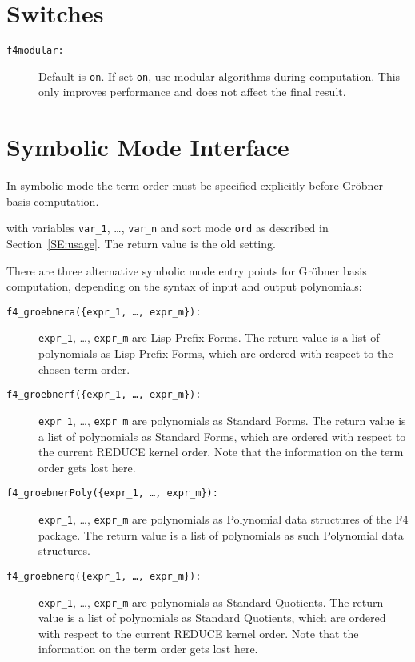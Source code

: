 \documentclass{article}
\newcommand{\grobner}{Gr\"obner}
\newcommand{\code}[1]{\texttt{#1}}
\begin{document}
\section{Switches}
\label{SE:switches}

\begin{description}
\item[\code{f4modular:}] Default is \code{on}. If set \code{on}, use modular algorithms
during computation. This only improves performance and does not affect the final result. 
\end{description}

\section{Symbolic Mode Interface}

In symbolic mode the term order must be specified explicitly before \grobner{} basis computation.
%
\begin{description}\sloppy
\item[\code{torder(\{\{'list, var\_1, \ldots, var\_n\}, ord\}):}] with variables \code{var\_1},
\dots, \code{var\_n} and sort mode \code{ord} as described in Section~\ref{SE:usage}. The return
value is the old setting.
\end{description}

There are three alternative symbolic mode entry points for \grobner{} basis computation, depending
on the syntax of input and output polynomials:
\begin{description}
\item[\code{f4\_groebnera(\{expr\_1, \ldots, expr\_m\}):}] \code{expr\_1}, \dots, \code{expr\_m} are
Lisp Prefix Forms. The return value is a list of polynomials as Lisp Prefix Forms, which are ordered
with respect to the chosen term order.
%
\item[\code{f4\_groebnerf(\{expr\_1, \ldots, expr\_m\}):}] \code{expr\_1}, \dots, \code{expr\_m} are
polynomials as Standard Forms. The return value is a list of polynomials as Standard Forms, which
are ordered with respect to the current REDUCE kernel order. Note that the information on the term
order gets lost here.
%
\item[\code{f4\_groebnerPoly(\{expr\_1, \ldots, expr\_m\}):}] \code{expr\_1}, \dots, \code{expr\_m}
are polynomials as Polynomial data structures of the F4 package. The return value is a list of
polynomials as such Polynomial data structures.
%
\item[\code{f4\_groebnerq(\{expr\_1, \ldots, expr\_m\}):}] \code{expr\_1}, \dots, \code{expr\_m} are
polynomials as Standard Quotients. The return value is a list
of polynomials as Standard Quotients, which are ordered with respect to the current REDUCE kernel
order. Note that the information on the term order gets lost here.
\end{description}
\end{document}
